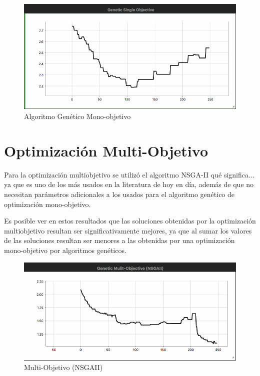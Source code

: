 \begin{figure}
    \centering
    \includegraphics[width=150mm]{Genetic.png}
    \caption{Algoritmo Genético Mono-objetivo}
    \label{fig:genetico}
\end{figure}

\section{Optimización Multi-Objetivo}

Para la optimización multiobjetivo se utilizó el algoritmo NSGA-II qué significa... ya que es uno de los más usados en la literatura de hoy en día, además de que no necesitan parámetros adicionales a los usados para el algoritmo genético de optimización mono-objetivo.

Es posible ver en estos resultados que las soluciones obtenidas por la optimización multiobjetivo resultan ser significativamente mejores, ya que al sumar los valores de las soluciones resultan ser menores a las obtenidas por una optimización mono-objetivo por algoritmos genéticos.

\begin{figure}
    \centering
    \includegraphics[width=150mm]{Multi-Objective.png}
    \caption{Multi-Objetivo (NSGAII)}
    \label{fig:multiobjetivo}
\end{figure}
